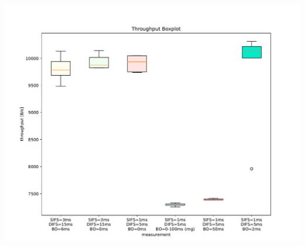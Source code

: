 \documentclass{article}
\begin{document}
	\includegraphics[width=\textwidth]{boxplot/throughput_boxplot}
\end{document}
